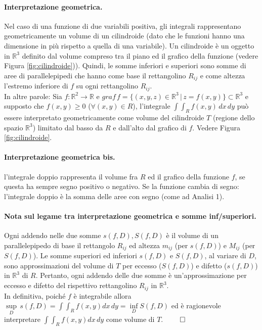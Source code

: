 \paragraph{Interpretazione geometrica.} Nel caso di una funzione di due variabili positiva, gli integrali rappresentano geometricamente un volume di un cilindroide (dato che le funzioni hanno una dimensione in più rispetto a quella di una variabile). Un cilindroide è un oggetto in $\mathbb{R}^3$ definito dal volume compreso tra il piano ed il grafico della funzione (vedere Figura \ref{fig:cilindroide})). Quindi, le somme inferiori e superiori sono somme di aree di parallelepipedi che hanno come base il rettangolino $R_{ij}$ e come altezza l'estremo inferiore di $f$ su ogni rettangolino $R_{ij}$.\\
In altre parole: Sia $f:\mathbb{R}^2\rightarrow\mathbb{R}$ e $graf\, f=\{(x,y,z)\in\mathbb{R}^3\, |\, z=f(x,y)\}\subset\mathbb{R}^3$ e supposto che $f(x,y)\geq 0$ ($\forall(x,y)\in R$), l'integrale $\int\int_R f(x,y)\, dx\, dy$ può essere interpretato geometricamente come volume del cilindroide $T$ (regione dello spazio $\mathbb{R}^3$) limitato dal basso da $R$ e dall'alto dal grafico di $f$. Vedere Figura \ref{fig:cilindroide}.

\paragraph{Interpretazione geometrica bis.} l'integrale doppio rappresenta il volume fra $R$ ed il grafico della funzione $f$, se questa ha sempre segno positivo o negativo. Se la funzione cambia di segno: l'integrale doppio è la somma delle aree con segno (come ad Analisi 1).

\paragraph{Nota sul legame tra interpretazione geometrica e somme inf/superiori.} Ogni addendo nelle due somme $s(f, D), S(f,D)$ è il volume di un parallelepipedo di base il rettangolo $R_{ij}$ ed altezza $m_{ij}$ (per $s(f, D)$) e $M_{ij}$ (per $S(f, D)$). Le somme superiori ed inferiori $s(f, D)$ e $S(f, D)$, al variare di $D$, sono approssimazioni del volume di $T$ per eccesso ($S(f, D)$) e difetto ($s(f, D)$) in $\mathbb{R}^3$ di $R$. Pertanto, ogni addendo delle due somme è un'approssimazione per eccesso e difetto del rispettivo rettangolino $R_{ij}$ in $\mathbb{R}^3$.\\
In definitiva, poiché $f$ è integrabile allora $\underset{D}{\sup} \, s(f,D) =\int\int_R f(x,y)dx\, dy =  \underset{D}{\inf} S(f,D)$ ed è ragionevole interpretare $\int\int_R f(x,y)dx\, dy$ come volume di $T$. $\qed$

